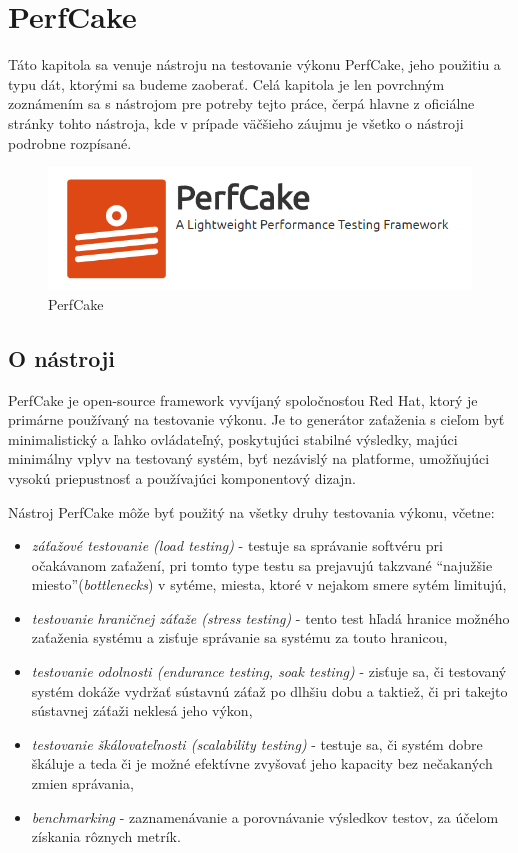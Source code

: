 \chapter{PerfCake}\label{perfcake}
\setcounter{page}{1}

Táto kapitola sa venuje nástroju na testovanie výkonu PerfCake, jeho použitiu a typu dát, ktorými sa budeme zaoberať. Celá kapitola je len povrchným zoznámením sa s nástrojom pre potreby tejto práce, čerpá hlavne z oficiálne stránky tohto nástroja, kde v prípade väčšieho záujmu je všetko o nástroji podrobne rozpísané.

\begin{figure}[ht]
\includegraphics[scale=1]{blog-logo.png}
\caption{PerfCake}
\end{figure} 

\section{O nástroji}

PerfCake je open-source framework vyvíjaný spoločnosťou Red Hat, ktorý je primárne používaný na testovanie výkonu. Je to generátor zaťaženia s cieľom byť minimalistický a ľahko ovládateľný, poskytujúci stabilné výsledky, majúci minimálny vplyv na testovaný systém, byť nezávislý na platforme, umožňujúci vysokú priepustnosť a používajúci komponentový dizajn.

Nástroj PerfCake môže byť použitý na všetky druhy testovania výkonu, včetne: 
\begin{itemize}  
\item \textit{záťažové testovanie (load testing)} - testuje sa správanie softvéru pri očakávanom zaťažení, pri tomto type testu sa prejavujú takzvané ``najužšie miesto''(\textit{bottlenecks}) v sytéme, miesta, ktoré v nejakom smere sytém limitujú,
\item \textit{testovanie hraničnej záťaže (stress testing)} - tento test hľadá hranice možného zaťaženia systému a zisťuje správanie sa systému za touto hranicou,
\item \textit{testovanie odolnosti (endurance testing, soak testing)} - zisťuje sa, či testovaný systém dokáže vydržať sústavnú záťaž po dlhšiu dobu a taktiež, či pri takejto sústavnej záťaži neklesá jeho výkon,
\item \textit{testovanie škálovateľnosti (scalability testing)} - testuje sa, či systém dobre škáluje a teda či je možné efektívne zvyšovať jeho kapacity bez nečakaných zmien správania,
\item \textit{benchmarking} - zaznamenávanie a porovnávanie výsledkov testov, za účelom získania rôznych metrík.
\end{itemize}

